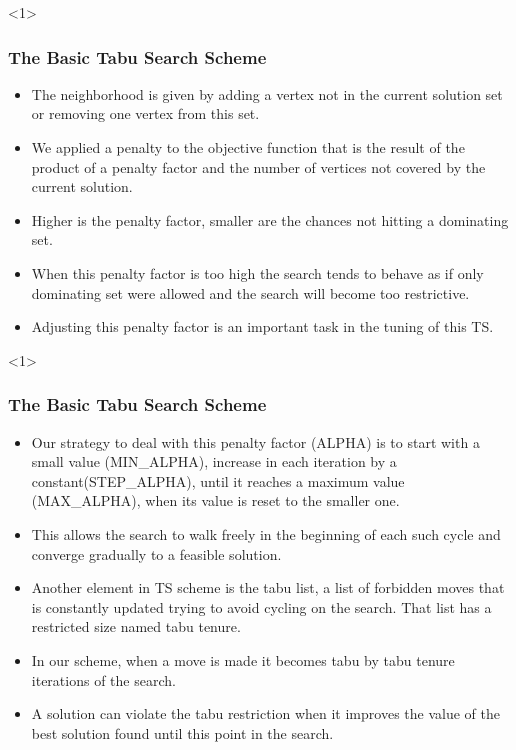 \documentclass{beamer}
\begin{document}
\begin{frame}<1>
  \frametitle{The Basic Tabu Search Scheme}

{ %

  \begin{itemize}
  	\item The neighborhood is given by adding a vertex not in the current solution set or removing one vertex from this set.
		\item We applied a penalty to the objective function that is the result of the product of a penalty factor and the
number of vertices not covered by the current solution.
		\item Higher is the penalty factor, smaller are the chances not hitting a dominating set.
		\item When this penalty factor is too high the search tends to behave as if only dominating set were allowed and the search will become too restrictive.
		\item Adjusting this penalty factor is an important task in the tuning of this TS.
  \end{itemize}

}
\end{frame}


\begin{frame}<1>
  \frametitle{The Basic Tabu Search Scheme}

{ \footnotesize

  \begin{itemize}
  	\item Our strategy to deal with this penalty factor (ALPHA) is to start with a small value (MIN\_ALPHA), increase in each iteration by a constant(STEP\_ALPHA), until it reaches a maximum value (MAX\_ALPHA), when its value is reset to the smaller one.
		\item This allows the search to walk freely in the beginning of each such cycle and converge gradually to a feasible solution.
		\item Another element in TS scheme is the tabu list, a list of forbidden moves that is constantly updated trying to avoid cycling on the search. That list has a restricted size named tabu tenure.
		\item In our scheme, when a move is made it becomes tabu by tabu tenure iterations of the search. 
		\item A solution can violate the tabu restriction when it improves the value of the best
solution found until this point in the search. 
  \end{itemize}

}
\end{frame}
\end{document}
